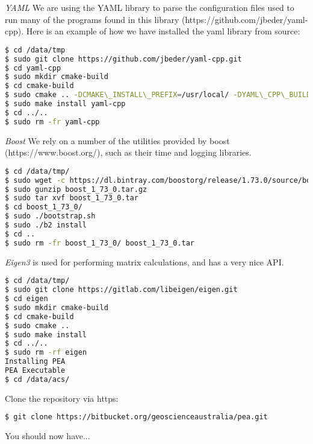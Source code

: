 \textit{YAML}
We are using the YAML library to parse the configuration files used to run many of the programs found in this library (https://github.com/jbeder/yaml-cpp). Here is an example of how we have installed the yaml library from source:
\begin{lstlisting}[language=bash]
$ cd /data/tmp
$ sudo git clone https://github.com/jbeder/yaml-cpp.git
$ cd yaml-cpp
$ sudo mkdir cmake-build
$ cd cmake-build
$ sudo cmake .. -DCMAKE\_INSTALL\_PREFIX=/usr/local/ -DYAML\_CPP\_BUILD\_TESTS=OFF
$ sudo make install yaml-cpp
$ cd ../..
$ sudo rm -fr yaml-cpp
\end{lstlisting}

\textit{Boost}
We rely on a number of the utilities provided by boost (https://www.boost.org/), such as their time and logging libraries.
\begin{lstlisting}[language=bash]
$ cd /data/tmp/
$ sudo wget -c https://dl.bintray.com/boostorg/release/1.73.0/source/boost_1_73_0.tar.gz
$ sudo gunzip boost_1_73_0.tar.gz
$ sudo tar xvf boost_1_73_0.tar
$ cd boost_1_73_0/
$ sudo ./bootstrap.sh
$ sudo ./b2 install
$ cd ..
$ sudo rm -fr boost_1_73_0/ boost_1_73_0.tar

\end{lstlisting}

\textit{Eigen3} is used for performing matrix calculations, and has a very nice API.
\begin{lstlisting}[language=bash]
$ cd /data/tmp/
$ sudo git clone https://gitlab.com/libeigen/eigen.git
$ cd eigen
$ sudo mkdir cmake-build
$ cd cmake-build
$ sudo cmake ..
$ sudo make install
$ cd ../..
$ sudo rm -rf eigen
Installing PEA
PEA Executable
$ cd /data/acs/
\end{lstlisting}
Clone the repository via https:

\begin{lstlisting}[language=bash]
$ git clone https://bitbucket.org/geoscienceaustralia/pea.git
\end{lstlisting}
You should now have...

